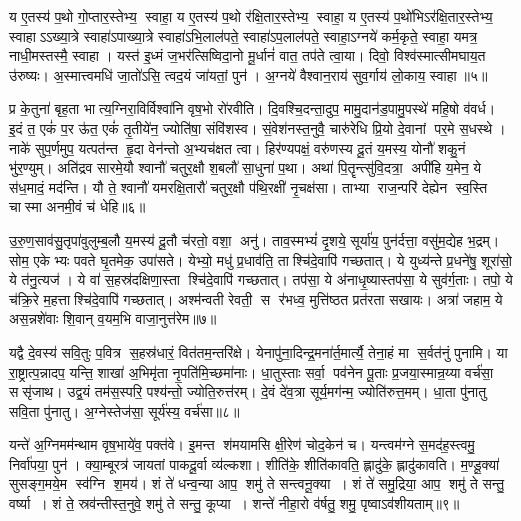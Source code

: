 य ए॒तस्य॑ प॒थो गो॒प्तार॒स्तेभ्य॒ स्वाहा॒ य ए॒तस्य॑ प॒थो र॑क्षि॒तार॒स्तेभ्य॒ स्वाहा॒ य ए॒तस्य॑ प॒थो॑भिऽर॑क्षि॒तार॒स्तेभ्य॒ स्वाहाऽऽख्या॒त्रे स्वाहा॑ऽपाख्या॒त्रे स्वाहा॑ऽभि॒लाल॑पते॒ स्वाहा॑ऽप॒लाल॑पते॒ स्वाहा॒ऽग्नये॑ कर्म॒कृते॒ स्वाहा॒ यमत्र॒ नाधी॒मस्तस्मै॒ स्वाहा। यस्त॑ इ॒ध्मं ज॒भर॑त्सिष्विदा॒नो मू॒र्धानं॑ वात॒ तप॑ते त्वा॒या। दिवो॒ विश्व॑स्मात्सीमघाय॒त उ॑रुष्यः। अ॒स्मात्त्वमधि॑ जा॒तो॑ऽसि॒ त्वद॒यं जा॑यतां॒ पुन॑। अ॒ग्नये॑ वैश्वान॒राय॑ सुव॒र्गाय॑ लो॒काय॒ स्वाहा॥५॥
\anuvakamend[य ए॒तस्य॒ त्वत्पञ्च॑]

प्र के॒तुना॑ बृह॒ता भात्य॒ग्निरा॒विर्विश्वा॑नि वृष॒भो रो॑रवीति। दि॒वश्चि॒दन्ता॒दुप॒ मामु॒दान॑ड॒पामु॒पस्थे॑ महि॒षो व॑वर्ध। इ॒दं त॒ एकं॑ प॒र ऊ॑त॒ एकं॑ तृ॒तीये॑न॒ ज्योति॑षा॒ संवि॑शस्व। सं॒वेश॑नस्त॒नुवै॒ चारु॑रेधि प्रि॒यो दे॒वानां पर॒मे स॒धस्थे। नाके॑ सुप॒र्णमुप॒ यत्पत॑न्त हृ॒दा वेन॑न्तो अ॒भ्यच॑क्षत त्वा। हिर॑ण्यपक्षं॒ वरु॑णस्य दू॒तं य॒मस्य॒ योनौ॑ शकु॒नं भु॑र॒ण्युम्। अति॑द्रव सारमे॒यौ श्वानौ॑ चतुर॒क्षौ श॒बलौ॑ सा॒धुना॑ प॒था। अथा॑ पि॒तॄन्त्सु॑वि॒दत्रा॒ अपी॑हि य॒मेन॒ ये स॑ध॒मादं॒ मद॑न्ति। यौ ते॒ श्वानौ॑ यमरक्षि॒तारौ॑ चतुर॒क्षौ प॑थि॒रक्षी॑ नृ॒चक्ष॑सा। ताभ्या राज॒न्परि॑ देह्येन स्व॒स्ति चास्मा अनमी॒वं च॑ धेहि॥६॥

उ॒रु॒ण॒साव॑सु॒तृपा॑वुलुम्ब॒लौ य॒मस्य॑ दू॒तौ च॑रतो॒ वशा॒ अनु॑। ताव॒स्मभ्यं॑ दृ॒शये॒ सूर्या॑य॒ पुन॑र्दत्ता॒ वसु॑म॒द्येह भ॒द्रम्। सोम॒ एकेभ्यः पवते घृ॒तमेक॒ उपा॑सते। येभ्यो॒ मधु॑ प्र॒धाव॑ति॒ ताश्चि॑दे॒वापि॑ गच्छतात्। ये युध्य॑न्ते प्र॒धने॑षु॒ शूरा॑सो॒ ये त॑नु॒त्यज॑। ये वा॑ स॒हस्र॑दक्षिणा॒स्ता श्चि॑दे॒वापि॑ गच्छतात्। तप॑सा॒ ये अ॑नाधृ॒ष्यास्तप॑सा॒ ये सुव॑र्ग॒ताः। तपो॒ ये च॑क्रि॒रे म॒हत्ताश्चि॑दे॒वापि॑ गच्छतात्। अश्म॑न्वती रेवती॒ स र॑भध्व॒ मुत्ति॑ष्ठत प्रत॑रता सखायः। अत्रा॑ जहाम॒ ये अस॒न्नशे॑वाः  शि॒वान् व॒यम॒भि वाजा॒नुत्त॑रेम॥७॥

यद्वै दे॒वस्य॑ सवि॒तुः प॒वित्र स॒हस्र॑धारं॒  वित॑तम॒न्तरि॑क्षे। येनापु॑ना॒दिन्द्र॒मना॑र्त॒मार्त्यै॒ तेना॒हं मा स॒र्वत॑नुं पुनामि। या रा॒ष्ट्रात्प॒न्नादप॒ यन्ति॒ शाखा॑ अ॒भिमृ॑ता नृ॒पति॑मि॒च्छमा॑नाः। धा॒तुस्ताः सर्वा॒ पव॑नेन पू॒ताः प्र॒जया॒स्मान्र॒य्या वर्च॑सा॒ ससृ॑जाथ। उद्व॒यं तम॑स॒स्परि॒ पश्य॑न्तो॒ ज्योति॒रुत्त॑रम्। दे॒वं दे॑व॒त्रा सूर्य॒मग॑न्म॒ ज्योति॑रुत्त॒मम्। धा॒ता पु॑नातु सवि॒ता पु॑नातु। अ॒ग्नेस्तेज॑सा॒ सूर्य॑स्य॒ वर्च॑सा॥८॥
\anuvakamend[धे॒ह्युत्त॑रेमा॒ष्टौ च॑]

यन्ते॑ अ॒ग्निमम॑न्थाम वृष॒भाये॑व॒ पक्त॑वे। इ॒मन्त श॑मयामसि क्षी॒रेण॑ चोद॒केन॑ च। यन्त्वम॑ग्ने स॒मद॑ह॒स्त्वमु॒ निर्वा॑पया॒ पुन॑। क्या॒म्बूरत्र॑ जायतां पाकदू॒र्वा व्य॑ल्कशा। शीति॑के॒ शीति॑कावति॒ ह्लादु॑के॒ ह्लादु॑कावति। म॒ण्डू॒क्या॑ सुसङ्ग॒मये॒म स्व॑ग्नि श॒मय॑। शं ते॑ धन्व॒न्या आप॒ शमु॑ ते सन्त्वनू॒क्या। शं ते॑ समु॒द्रिया॒ आप॒ शमु॑ ते सन्तु॒ वर्ष्या। शं ते॒ स्रव॑न्तीस्त॒नुवे॒ शमु॑ ते सन्तु॒ कूप्या। शन्ते॑ नीहा॒रो व॑र्\mbox{}षतु॒ शमु॒ पृष्वाऽव॑शीयताम्॥९॥

